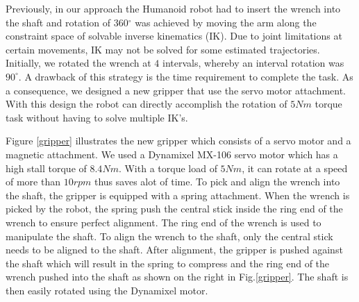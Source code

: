 \documentclass{standalone}
\begin{document}
Previously, in our approach the Humanoid robot had to insert the
wrench into the shaft and rotation of 360$^{\circ}$ was achieved
by moving the arm along the constraint space of solvable inverse
kinematics (IK). Due to joint limitations at certain movements, IK may
not be solved for some estimated trajectories. Initially, we rotated
the wrench at $4$ intervals, whereby an interval rotation was
$90^{\circ}$. A drawback of this strategy is the time requirement to
complete the task. As a consequence, we designed a new
gripper that use the servo motor attachment. With this design the
robot can directly accomplish the rotation of $5Nm$ torque task
without having to solve multiple IK's.



Figure \ref{gripper} illustrates the new gripper which consists of a
servo motor and a magnetic attachment. We used a Dynamixel MX-106
servo motor which has a high stall torque
of $8.4Nm$. With a torque load of $5Nm$, it can rotate at a speed of
more than $10 rpm$ thus saves alot of time.
To pick and align the wrench into the shaft, the gripper is equipped
with a spring attachment. When the wrench is picked by the robot, the
spring push the central stick inside the ring end of the wrench to
ensure perfect alignment. The ring end of the wrench is used to
manipulate the shaft. To align the wrench to the shaft, only the
central stick needs to be aligned to the shaft. After alignment, the
gripper is pushed against the shaft which will result in the spring to
compress and the ring end of the wrench pushed into the shaft as shown
on the right in Fig.\ref{gripper}. The shaft is then easily rotated
using the Dynamixel motor.

\end{document}
